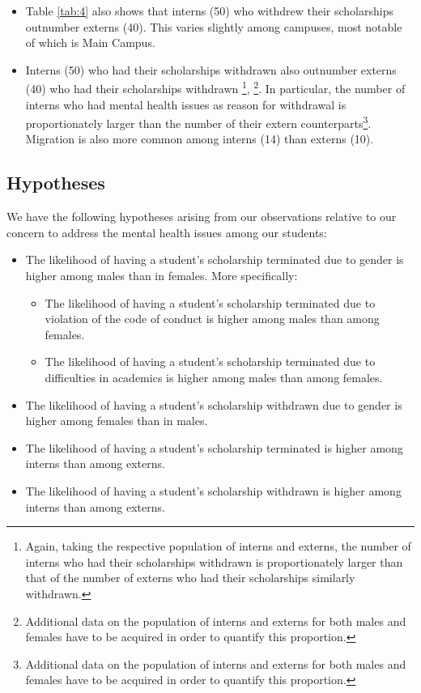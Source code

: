 \documentclass[a4paper]{article}
\providecommand{\tightlist}{%
  \setlength{\itemsep}{0pt}\setlength{\parskip}{0pt}}
\let\rmarkdownfootnote\footnote%
\def\footnote{\protect\rmarkdownfootnote}
\begin{document}
\begin{itemize}
\tightlist
\item
  Table \ref{tab:4} also shows that interns (50) who withdrew their
  scholarships outnumber externs (40). This varies slightly among
  campuses, most notable of which is Main Campus.
\item
  Interns (50) who had their scholarships withdrawn also outnumber
  externs (40) who had their scholarships withdrawn \footnote{Again,
    taking the respective population of interns and externs, the number
    of interns who had their scholarships withdrawn is proportionately
    larger than that of the number of externs who had their scholarships
    similarly withdrawn.}, \footnote{Additional data on the population
    of interns and externs for both males and females have to be
    acquired in order to quantify this proportion.}. In particular, the
  number of interns who had mental health issues as reason for
  withdrawal is proportionately larger than the number of their extern
  counterparts\footnote{Additional data on the population of interns and
    externs for both males and females have to be acquired in order to
    quantify this proportion.}. Migration is also more common among
  interns (14) than externs (10).
\end{itemize}

\hypertarget{hypotheses}{%
\subsection{Hypotheses}\label{hypotheses}}

We have the following hypotheses arising from our observations relative
to our concern to address the mental health issues among our students:

\begin{itemize}
\item
  The likelihood of having a student's scholarship terminated due to
  gender is higher among males than in females. More specifically:

  \begin{itemize}
  \tightlist
  \item
    The likelihood of having a student's scholarship terminated due to
    violation of the code of conduct is higher among males than among
    females.
  \item
    The likelihood of having a student's scholarship terminated due to
    difficulties in academics is higher among males than among females.
  \end{itemize}
\item
  The likelihood of having a student's scholarship withdrawn due to
  gender is higher among females than in males.
\item
  The likelihood of having a student's scholarship terminated is higher
  among interns than among externs.
\item
  The likelihood of having a student's scholarship withdrawn is higher
  among interns than among externs.
\end{itemize}
\end{document}
